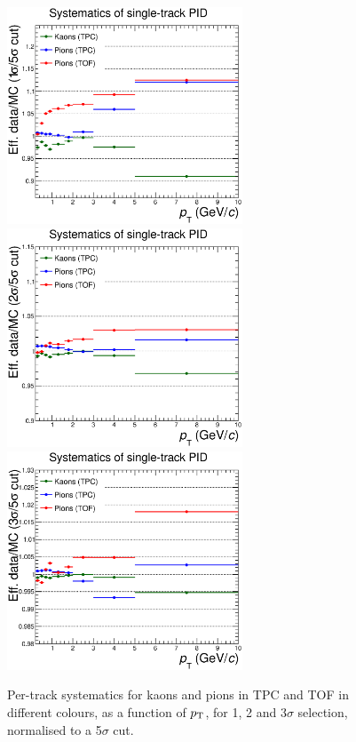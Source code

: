 \begin{figure}[!h]
 \centering
 \includegraphics[angle=0, width=7cm]{./FigCap5/PIDsyst_1over5sigmaCut.eps}
 \includegraphics[angle=0, width=7cm]{./FigCap5/PIDsyst_2over5sigmaCut.eps}
 \includegraphics[angle=0, width=7cm]{./FigCap5/PIDsyst_3over5sigmaCut.eps}
 \caption{Per-track systematics for kaons and pions in TPC and TOF in different colours, as a function of $p_{\rm T}$, for 1, 2 and 3$\sigma$ selection, normalised to a 5$\sigma$ cut. }
 \label{fig:PerTrackPIDsys} 
\end{figure}


